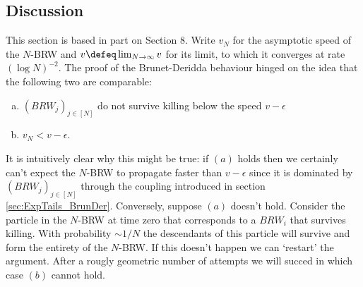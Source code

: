 \subsection{Discussion}
This section is based in part on \cite{exp_tails} Section 8. Write $v_N$ for the asymptotic speed of the $N$-BRW and $v \defeq \lim_{N \to \infty} v$ for its limit, to which it converges at rate $(\log N)^{-2}$. The proof of the Brunet-Deridda behaviour hinged on the idea that the following two are comparable:
\begin{enumerate}[(a)]
\item \vspace{-1mm} $(BRW_j)_{j \in [N]}$ do not survive killing below the speed $v - \epsilon$
\item \vspace{-3mm} $v_N < v - \epsilon$. 
\end{enumerate}
\vspace{-3mm}
It is intuitively clear why this might be true: if $(a)$ holds then we certainly can't expect the $N$-BRW to propagate faster than $v - \epsilon$ since it is dominated by $(BRW_j)_{j \in [N]}$ through the coupling introduced in section \ref{sec:ExpTails_BrunDer}. Conversely, suppose $(a)$ doesn't hold. Consider the particle in the $N$-BRW at time zero that corresponds to a $BRW_i$ that survives killing. With probability $ \sim 1/N$ the descendants of this particle will survive and form the entirety of the $N$-BRW. If this doesn't happen we can `restart' the argument. After a rougly geometric number of attempts we will succed in which case $(b)$ cannot hold. \\

